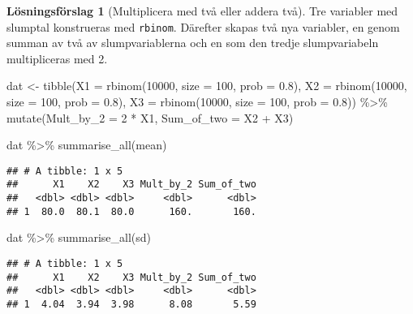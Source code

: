 \documentclass[
]{book}
\newenvironment{Shaded}{\begin{snugshade}}{\end{snugshade}}
\newcommand{\AttributeTok}[1]{\textcolor[rgb]{0.77,0.63,0.00}{#1}}
\newcommand{\DecValTok}[1]{\textcolor[rgb]{0.00,0.00,0.81}{#1}}
\newcommand{\FloatTok}[1]{\textcolor[rgb]{0.00,0.00,0.81}{#1}}
\newcommand{\FunctionTok}[1]{\textcolor[rgb]{0.00,0.00,0.00}{#1}}
\newcommand{\NormalTok}[1]{#1}
\newcommand{\OtherTok}[1]{\textcolor[rgb]{0.56,0.35,0.01}{#1}}
\newcommand{\SpecialCharTok}[1]{\textcolor[rgb]{0.00,0.00,0.00}{#1}}
\theoremstyle{definition}
\theoremstyle{definition}
\theoremstyle{definition}
\theoremstyle{definition}
\newtheorem{hypothesis}{Lösningsförslag}[chapter]
\theoremstyle{remark}
\begin{document}
\begin{hypothesis}[Multiplicera med två eller addera två]
Tre variabler med slumptal konstrueras med \texttt{rbinom}. Därefter skapas två nya variabler, en genom summan av två av slumpvariablerna och en som den tredje slumpvariabeln multipliceras med 2.

\begin{Shaded}
\begin{Highlighting}[]
\NormalTok{dat }\OtherTok{\textless{}{-}} \FunctionTok{tibble}\NormalTok{(}\AttributeTok{X1 =} \FunctionTok{rbinom}\NormalTok{(}\DecValTok{10000}\NormalTok{, }\AttributeTok{size =} \DecValTok{100}\NormalTok{, }\AttributeTok{prob =} \FloatTok{0.8}\NormalTok{),}
              \AttributeTok{X2 =} \FunctionTok{rbinom}\NormalTok{(}\DecValTok{10000}\NormalTok{, }\AttributeTok{size =} \DecValTok{100}\NormalTok{, }\AttributeTok{prob =} \FloatTok{0.8}\NormalTok{),}
              \AttributeTok{X3 =} \FunctionTok{rbinom}\NormalTok{(}\DecValTok{10000}\NormalTok{, }\AttributeTok{size =} \DecValTok{100}\NormalTok{, }\AttributeTok{prob =} \FloatTok{0.8}\NormalTok{)) }\SpecialCharTok{\%\textgreater{}\%} 
  \FunctionTok{mutate}\NormalTok{(}\AttributeTok{Mult\_by\_2 =} \DecValTok{2} \SpecialCharTok{*}\NormalTok{ X1,}
         \AttributeTok{Sum\_of\_two =}\NormalTok{ X2 }\SpecialCharTok{+}\NormalTok{ X3)}

\NormalTok{dat }\SpecialCharTok{\%\textgreater{}\%} 
  \FunctionTok{summarise\_all}\NormalTok{(mean)}
\end{Highlighting}
\end{Shaded}

\begin{verbatim}
## # A tibble: 1 x 5
##      X1    X2    X3 Mult_by_2 Sum_of_two
##   <dbl> <dbl> <dbl>     <dbl>      <dbl>
## 1  80.0  80.1  80.0      160.       160.
\end{verbatim}

\begin{Shaded}
\begin{Highlighting}[]
\NormalTok{dat }\SpecialCharTok{\%\textgreater{}\%} 
  \FunctionTok{summarise\_all}\NormalTok{(sd)}
\end{Highlighting}
\end{Shaded}

\begin{verbatim}
## # A tibble: 1 x 5
##      X1    X2    X3 Mult_by_2 Sum_of_two
##   <dbl> <dbl> <dbl>     <dbl>      <dbl>
## 1  4.04  3.94  3.98      8.08       5.59
\end{verbatim}


\end{hypothesis}
\end{document}
